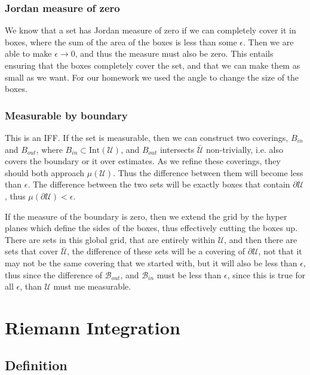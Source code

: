 \documentclass[12pt]{armath}
\newcommand{\U}{\mathcal{U}}
\newcommand{\B}{\mathcal{B}}
\newcommand{\ra}{\rightarrow}
\begin{document}
  \subsubsection{Jordan measure of zero}%
  \label{ssub:jordan_measure_of_zero}

  We know that a set has Jordan measure of zero if we can completely cover it in
  boxes, where the sum of the area of the boxes is less than some $\epsilon$.
  Then we are able to make $\epsilon\ra0$, and thus the measure must also be
  zero. This entails ensuring that the boxes completely cover the set, and that
  we can make them as small as we want. For our homework we used the angle to
  change the size of the boxes.

  \subsubsection{Measurable by boundary}%
  \label{ssub:measurable_by_boundary}

  This is an IFF. If the set is measurable, then we can construct two coverings,
  $B_{in}$ and $B_{out}$, where $B_{in}\subset\text{Int}(\U)$, and $B_{out}$
  intersects $\bar{\U}$ non-trivially, i.e. also covers the boundary or it over
  estimates. As we refine these coverings, they should both approach $\mu(\U)$.
  Thus the difference between them will become less than $\epsilon$. The
  difference between the two sets will be exactly boxes that contain $\partial
  \U$, thus $\mu(\partial\U)<\epsilon$.

  If the measure of the boundary is zero, then we extend the grid by the
  hyper planes which define the sides of the boxes, thus effectively cutting the
  boxes up. There are sets in this global grid, that are entirely within $\U$,
  and then there are sets that cover $\bar{\U}$, the difference of these sets
  will be a covering of $\partial \U$, not that it may not be the same covering
  that we started with, but it will also be less than $\epsilon$, thus since the
  difference of $\B_{out}$, and $\B_{in}$ must be less than $\epsilon$, since
  this is true for all $\epsilon$, than $\U$ must me measurable.

  \section{Riemann Integration}%
  \label{sec:riemann_integration}

  \subsection{Definition}%
  \label{sub:definition}
\end{document}
